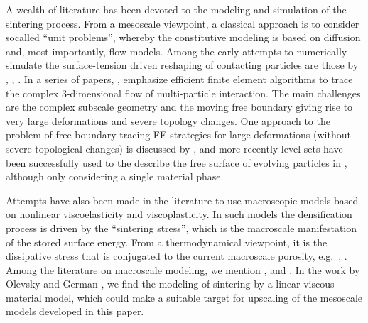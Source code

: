 \documentclass[12pt,a4paper]{article}
\begin{document}
A wealth of literature has been devoted to the modeling and simulation of the sintering process.
From a mesoscale viewpoint, a classical approach is to consider socalled ``unit problems'', whereby the constitutive modeling is based on diffusion and, most importantly, flow models.
Among the early attempts to numerically simulate the surface-tension driven reshaping of contacting particles are those by \cite{jagota_micromechanical_1988}, \cite{jagota_micromechanical_1988-1}, \cite{van_de_vorst_integral_1993}.
In a series of papers, \cite{zhou_three-dimensional_1998}, \cite{zhou_assessment_2001} emphasize efficient finite element algorithms to trace the complex 3-dimensional flow of multi-particle interaction.
The main challenges  are the complex subscale geometry and the moving free boundary giving rise to very large deformations and severe topology changes.
One approach to the problem of free-boundary tracing FE-strategies for large deformations (without severe topological changes) is discussed by \cite{dettmer_computational_2006}, and more recently level-sets have been successfully used to the describe the free surface of evolving particles in \cite{pino_munoz_direct_2013}, although only considering a single material phase.


Attempts have also been made in the literature to use macroscopic models based on nonlinear viscoelasticity and viscoplasticity.
In such models the densification process is driven by the ``sintering stress'', which is the macroscale manifestation of the stored surface energy.
From a thermodynamical viewpoint, it is the dissipative stress that is conjugated to the current macroscale porosity, e.g.\ \cite{reid_continuum_1990}, \cite{mahler_modelling_2000}.
Among the literature on macroscale modeling, we mention \cite{svoboda_model_1996}, \cite{xu_micromechanical_1997} and \cite{lu_porosity_2001}.
In the work by Olevsky and German \cite{olevsky_theory_1998}, \cite{olevsky_effect_2000} we find the modeling of sintering by a linear viscous material model, which could make a suitable target for upscaling of the mesoscale models developed in this paper.
\end{document}
